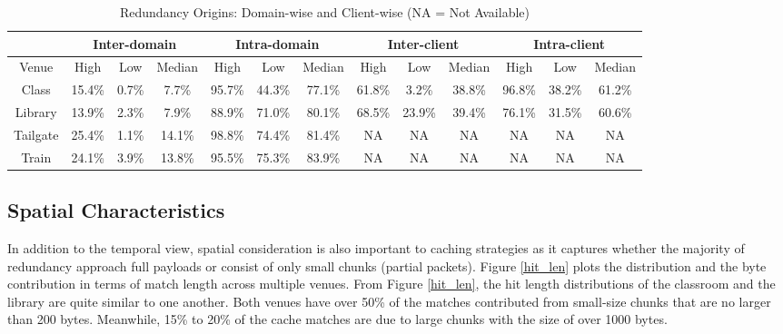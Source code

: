\documentclass{sig-alternate}
\begin{document}
\begin{table*}[ht!]
\centering
\begin{tabular}{|c|c|c|c|c|c|c||c|c|c|c|c|c|}
\hline
          & \multicolumn{3}{c|}{Inter-domain}  & \multicolumn{3}{c||}{Intra-domain}  & \multicolumn{3}{c|}{Inter-client}  & \multicolumn{3}{c|}{Intra-client}  \\\hline
 Venue    & High      & Low      & Median      & High      & Low      & Median       & High      & Low      & Median      & High      & Low      & Median      \\\hline  
 Class    & 15.4\%    & 0.7\%    & 7.7\%       & 95.7\%    & 44.3\%   & 77.1\%       & 61.8\%    & 3.2\%    & 38.8\%      & 96.8\%    & 38.2\%   & 61.2\%    \\
 Library  & 13.9\%    & 2.3\%    & 7.9\%       & 88.9\%    & 71.0\%   & 80.1\%       & 68.5\%    & 23.9\%   & 39.4\%      & 76.1\%    & 31.5\%   & 60.6\%    \\  
 Tailgate & 25.4\%    & 1.1\%    & 14.1\%      & 98.8\%    & 74.4\%   & 81.4\%       & NA        & NA       & NA          & NA        & NA       & NA        \\
 Train    & 24.1\%    & 3.9\%    & 13.8\%      & 95.5\%    & 75.3\%   & 83.9\%       & NA        & NA       & NA          & NA        & NA       & NA        \\\hline                       
\end{tabular} 
\caption{Redundancy Origins: Domain-wise and Client-wise (NA = Not Available)} 
\label{Table:Contribution}
\end{table*}

\subsection{Spatial Characteristics}

In addition to the temporal view, spatial consideration is also important to caching strategies as it captures whether the majority of redundancy approach full payloads or consist of only small chunks (partial packets). Figure \ref{hit_len} plots the distribution and the byte contribution in terms of match length across multiple venues. From Figure \ref{hit_len}, the hit length distributions of the classroom and the library are quite similar to one another. Both venues have over 50\% of the matches contributed from small-size chunks that are no larger than 200 bytes. Meanwhile, 15\% to 20\% of the cache matches are due to large chunks with the size of over 1000 bytes. 
\end{document}
